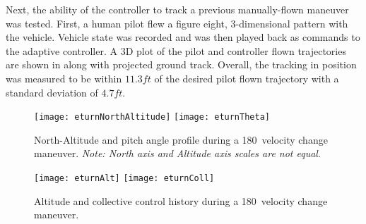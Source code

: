 Next, the ability of the controller to track a previous
manually-flown maneuver was tested. First, a human pilot flew a
figure eight, 3-dimensional pattern with the vehicle. Vehicle state
was recorded and was then played back as commands to the adaptive
controller. A 3D plot of the pilot and controller flown trajectories
are shown in  along with projected ground track.
Overall, the tracking in position was measured to be within $11.3
ft$ of the desired pilot flown trajectory with a standard deviation
of $4.7 ft$.
%

\begin{figure}
  \begin{center}
  \texttt{[image: eturnNorthAltitude]}
  \texttt{[image: eturnTheta]}
  \caption{North-Altitude and pitch angle profile during a 180\textdegree\ velocity change maneuver. \emph{Note: North axis and Altitude axis scales are not equal}.}
  \label{f:eturnAltTheta}
  \end{center}
\end{figure}

\begin{figure}
  \begin{center}
  \texttt{[image: eturnAlt]}
  \texttt{[image: eturnColl]}
  \caption{Altitude and collective control history during a 180\textdegree\ velocity change maneuver.}
  \label{f:eturnAltColl}
  \end{center}
\end{figure}

